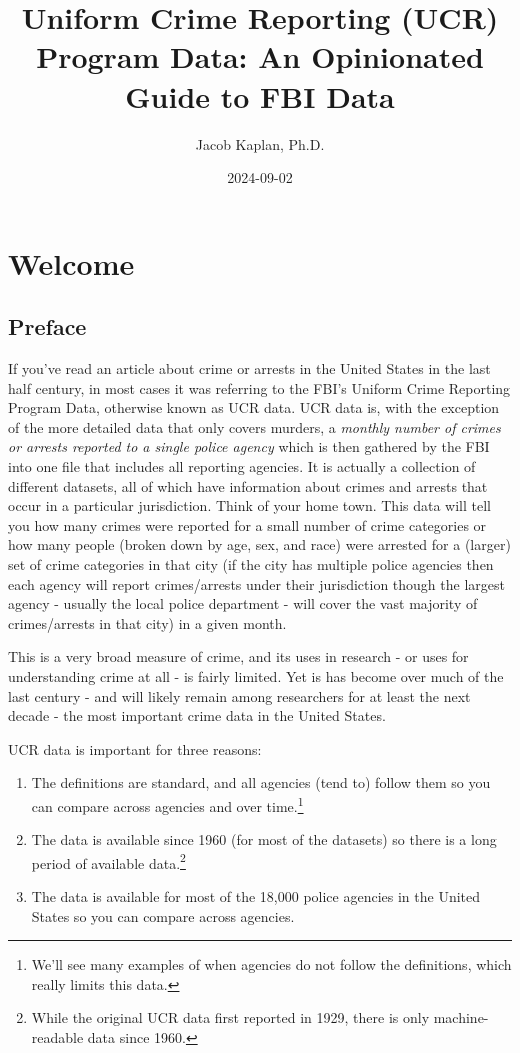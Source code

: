 \documentclass[
  12pt,
  openany]{book}
\title{Uniform Crime Reporting (UCR) Program Data: An Opinionated Guide to FBI Data}
\author{Jacob Kaplan, Ph.D.}
\date{2024-09-02}
\providecommand{\tightlist}{%
  \setlength{\itemsep}{0pt}\setlength{\parskip}{0pt}}
\begin{document}
\maketitle

{
\hypersetup{linkcolor=}
\setcounter{tocdepth}{2}
\tableofcontents
}
\listoffigures
\listoftables
{}
\part{Welcome}\label{part-welcome}

\chapter{Preface}\label{preface}

If you've read an article about crime or arrests in the United States in the last half century, in most cases it was referring to the FBI's Uniform Crime Reporting Program Data, otherwise known as UCR data. UCR data is, with the exception of the more detailed data that only covers murders, a \emph{monthly number of crimes or arrests reported to a single police agency} which is then gathered by the FBI into one file that includes all reporting agencies. It is actually a collection of different datasets, all of which have information about crimes and arrests that occur in a particular jurisdiction. Think of your home town. This data will tell you how many crimes were reported for a small number of crime categories or how many people (broken down by age, sex, and race) were arrested for a (larger) set of crime categories in that city (if the city has multiple police agencies then each agency will report crimes/arrests under their jurisdiction though the largest agency - usually the local police department - will cover the vast majority of crimes/arrests in that city) in a given month.

This is a very broad measure of crime, and its uses in research - or uses for understanding crime at all - is fairly limited. Yet is has become over much of the last century - and will likely remain among researchers for at least the next decade - the most important crime data in the United States.

UCR data is important for three reasons:

\begin{enumerate}
\def\labelenumi{\arabic{enumi}.}
\tightlist
\item
  The definitions are standard, and all agencies (tend to) follow them so you can compare across agencies and over time.\footnote{We'll see many examples of when agencies do not follow the definitions, which really limits this data.}
\item
  The data is available since 1960 (for most of the datasets) so there is a long period of available data.\footnote{While the original UCR data first reported in 1929, there is only machine-readable data since 1960.}
\item
  The data is available for most of the 18,000 police agencies in the United States so you can compare across agencies.
\end{enumerate}
\end{document}
